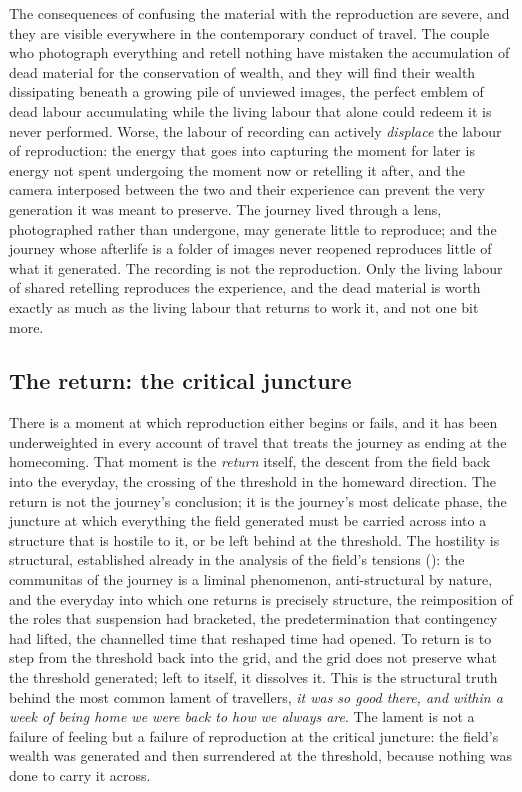 The consequences of confusing the material with the reproduction are severe, and they are visible everywhere in the contemporary conduct of travel. The couple who photograph everything and retell nothing have mistaken the accumulation of dead material for the conservation of wealth, and they will find their wealth dissipating beneath a growing pile of unviewed images, the perfect emblem of dead labour accumulating while the living labour that alone could redeem it is never performed. Worse, the labour of recording can actively \emph{displace} the labour of reproduction: the energy that goes into capturing the moment for later is energy not spent undergoing the moment now or retelling it after, and the camera interposed between the two and their experience can prevent the very generation it was meant to preserve. The journey lived through a lens, photographed rather than undergone, may generate little to reproduce; and the journey whose afterlife is a folder of images never reopened reproduces little of what it generated. The recording is not the reproduction. Only the living labour of shared retelling reproduces the experience, and the dead material is worth exactly as much as the living labour that returns to work it, and not one bit more.

\subsection{The return: the critical juncture}
\label{p21:sub:reproduction-return}

There is a moment at which reproduction either begins or fails, and it has been underweighted in every account of travel that treats the journey as ending at the homecoming. That moment is the \emph{return} itself, the descent from the field back into the everyday, the crossing of the threshold in the homeward direction. The return is not the journey's conclusion; it is the journey's most delicate phase, the juncture at which everything the field generated must be carried across into a structure that is hostile to it, or be left behind at the threshold. The hostility is structural, established already in the analysis of the field's tensions (): the communitas of the journey is a liminal phenomenon, anti-structural by nature, and the everyday into which one returns is precisely structure, the reimposition of the roles that suspension had bracketed, the predetermination that contingency had lifted, the channelled time that reshaped time had opened. To return is to step from the threshold back into the grid, and the grid does not preserve what the threshold generated; left to itself, it dissolves it. This is the structural truth behind the most common lament of travellers, \emph{it was so good there, and within a week of being home we were back to how we always are}. The lament is not a failure of feeling but a failure of reproduction at the critical juncture: the field's wealth was generated and then surrendered at the threshold, because nothing was done to carry it across.

